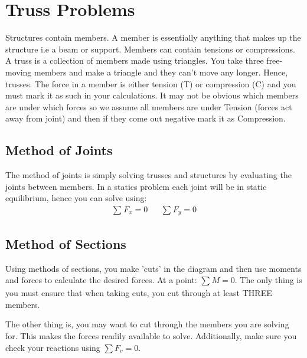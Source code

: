 \documentclass[a4paper, 12pt]{article}
\begin{document}
\section{Truss Problems}
Structures contain members. A member is essentially anything that makes up the structure i.e a beam or support. 
Members can contain tensions or compressions. A truss is a collection of members made using triangles. You take
three free-moving members and make a triangle and they can't move any longer. Hence, trusses. The force in a 
member is either tension (T) or compression (C) and you must mark it as such in your calculations. 
It may not be obvious which members are under which forces so we assume all members are under Tension 
(forces act away from joint) and then if they come out negative mark it as Compression. 

\newpage

\subsection{Method of Joints}
The method of joints is simply solving trusses and structures by evaluating the joints between members. 
In a statics problem each joint will be in static equilibrium, hence you can solve using:
\begin{align*}
    \sum_{}F_x=0 && \sum_{}F_y=0  
\end{align*}

\subsection{Method of Sections}
Using methods of sections, you make 'cuts' in the diagram and then use moments
and forces to calculate the desired forces. At a point: $\sum_{}M=0$. The only thing is
you must ensure that when taking cuts, you cut through at least THREE members. 

The other thing is, you may want to cut through the members you are solving for. This makes 
the forces readily available to solve. Additionally, make sure you check your reactions
using $\sum F_v = 0$. 
\end{document}
